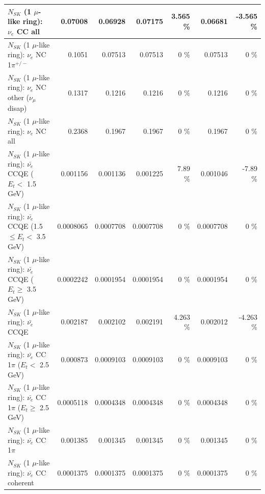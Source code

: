\begin{table}
\begin{tabular}{| l | r | r | r  r | r  r |}
                                  $N_{SK}$ (1 $\mu$-like ring): $\nu_{e}$ CC all &         0.07008 &         0.06928 &         0.07175 &    3.565 \%  &         0.06681 &   -3.565 \%  \\ 
\hline
                           $N_{SK}$ (1 $\mu$-like ring): $\nu_e$ NC 1$\pi^{+/-}$ &          0.1051 &         0.07513 &         0.07513 &        0 \%  &         0.07513 &        0 \%  \\ 
                $N_{SK}$ (1 $\mu$-like ring): $\nu_e$ NC other ($\nu_\mu$ disap) &          0.1317 &          0.1216 &          0.1216 &        0 \%  &          0.1216 &        0 \%  \\ 
                                  $N_{SK}$ (1 $\mu$-like ring): $\nu_{e}$ NC all &          0.2368 &          0.1967 &          0.1967 &        0 \%  &          0.1967 &        0 \%  \\ 
\hline
\hline
\hline
            $N_{SK}$ (1 $\mu$-like ring): $\bar{\nu_e}$ CCQE ($E_{t} <$ 1.5 GeV) &        0.001156 &        0.001136 &        0.001225 &     7.89 \%  &        0.001046 &    -7.89 \%  \\ 
   $N_{SK}$ (1 $\mu$-like ring): $\bar{\nu_e}$ CCQE (1.5 $\leq E_{t} <$ 3.5 GeV) &       0.0008065 &       0.0007708 &       0.0007708 &        0 \%  &       0.0007708 &        0 \%  \\ 
         $N_{SK}$ (1 $\mu$-like ring): $\bar{\nu_e}$ CCQE ($E_{t} \geq$ 3.5 GeV) &       0.0002242 &       0.0001954 &       0.0001954 &        0 \%  &       0.0001954 &        0 \%  \\ 
\hline
                                $N_{SK}$ (1 $\mu$-like ring): $\bar{\nu_e}$ CCQE &        0.002187 &        0.002102 &        0.002191 &    4.263 \%  &        0.002012 &   -4.263 \%  \\ 
\hline
       $N_{SK}$ (1 $\mu$-like ring): $\bar{\nu_e}$ CC 1$\pi$ ($E_{t} <$ 2.5 GeV) &        0.000873 &       0.0009103 &       0.0009103 &        0 \%  &       0.0009103 &        0 \%  \\ 
    $N_{SK}$ (1 $\mu$-like ring): $\bar{\nu_e}$ CC 1$\pi$ ($E_{t} \geq$ 2.5 GeV) &       0.0005118 &       0.0004348 &       0.0004348 &        0 \%  &       0.0004348 &        0 \%  \\ 
\hline
                           $N_{SK}$ (1 $\mu$-like ring): $\bar{\nu_e}$ CC 1$\pi$ &        0.001385 &        0.001345 &        0.001345 &        0 \%  &        0.001345 &        0 \%  \\ 
                         $N_{SK}$ (1 $\mu$-like ring): $\bar{\nu_e}$ CC coherent &       0.0001375 &       0.0001375 &       0.0001375 &        0 \%  &       0.0001375 &        0 \%  \\ 

\end{tabular}
\end{table}
